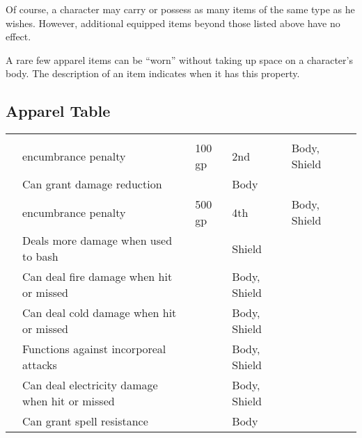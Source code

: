         Of course, a character may carry or possess as many items of the same type as he wishes.
        However, additional equipped items beyond those listed above have no effect.

        A rare few apparel items can be ``worn'' without taking up space on a character's body.
        The description of an item indicates when it has this property.

        \onecolumn

    \subsection{Apparel Table}

        \begin{longtabuwrapper}
            \begin{longtabu}{l X l l l l}
                 &  &  &  &  &  \\
                  &  encumbrance penalty & 100 gp & 2nd & Body, Shield &  \\
                 & Can grant damage reduction &  & Body &  \\
                  &  encumbrance penalty & 500 gp & 4th & Body, Shield &  \\
                 & Deals more damage when used to bash &  & Shield &  \\
                 & Can deal fire damage when hit or missed &  & Body, Shield &  \\
                 & Can deal cold damage when hit or missed &  & Body, Shield &  \\
                 & Functions against incorporeal attacks &  & Body, Shield &  \\
                 & Can deal electricity damage when hit or missed &  & Body, Shield &  \\
                 & Can grant spell resistance &  & Body &  \\

\end{longtabu}
\end{longtabuwrapper}
